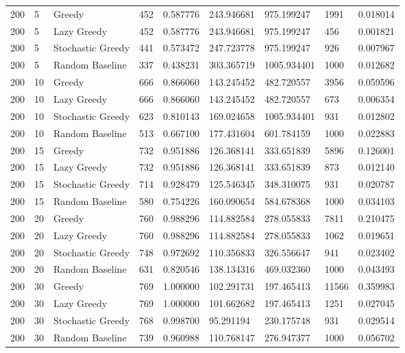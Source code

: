 \begin{tabular}{lllllllll}
200 & 5 & Greedy & 452 & 0.587776 & 243.946681 & 975.199247 & 1991 & 0.018014 \\
200 & 5 & Lazy Greedy & 452 & 0.587776 & 243.946681 & 975.199247 & 456 & 0.001821 \\
200 & 5 & Stochastic Greedy & 441 & 0.573472 & 247.723778 & 975.199247 & 926 & 0.007967 \\
200 & 5 & Random Baseline & 337 & 0.438231 & 303.365719 & 1005.934401 & 1000 & 0.012682 \\
200 & 10 & Greedy & 666 & 0.866060 & 143.245452 & 482.720557 & 3956 & 0.059596 \\
200 & 10 & Lazy Greedy & 666 & 0.866060 & 143.245452 & 482.720557 & 673 & 0.006354 \\
200 & 10 & Stochastic Greedy & 623 & 0.810143 & 169.024658 & 1005.934401 & 931 & 0.012802 \\
200 & 10 & Random Baseline & 513 & 0.667100 & 177.431604 & 601.784159 & 1000 & 0.022883 \\
200 & 15 & Greedy & 732 & 0.951886 & 126.368141 & 333.651839 & 5896 & 0.126001 \\
200 & 15 & Lazy Greedy & 732 & 0.951886 & 126.368141 & 333.651839 & 873 & 0.012140 \\
200 & 15 & Stochastic Greedy & 714 & 0.928479 & 125.546345 & 348.310075 & 931 & 0.020787 \\
200 & 15 & Random Baseline & 580 & 0.754226 & 160.090654 & 584.678368 & 1000 & 0.034103 \\
200 & 20 & Greedy & 760 & 0.988296 & 114.882584 & 278.055833 & 7811 & 0.210475 \\
200 & 20 & Lazy Greedy & 760 & 0.988296 & 114.882584 & 278.055833 & 1062 & 0.019651 \\
200 & 20 & Stochastic Greedy & 748 & 0.972692 & 110.356833 & 326.556647 & 941 & 0.023402 \\
200 & 20 & Random Baseline & 631 & 0.820546 & 138.134316 & 469.032360 & 1000 & 0.043493 \\
200 & 30 & Greedy & 769 & 1.000000 & 102.291731 & 197.465413 & 11566 & 0.359983 \\
200 & 30 & Lazy Greedy & 769 & 1.000000 & 101.662682 & 197.465413 & 1251 & 0.027045 \\
200 & 30 & Stochastic Greedy & 768 & 0.998700 & 95.291194 & 230.175748 & 931 & 0.029514 \\
200 & 30 & Random Baseline & 739 & 0.960988 & 110.768147 & 276.947377 & 1000 & 0.056702 \\
\hline
\end{tabular}
